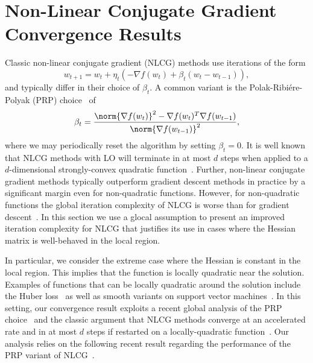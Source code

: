 \documentclass[10pt]{article} %
\newif\ifextended
\begin{document}
\ifextended
\section{Non-Linear Conjugate Gradient Convergence Results}\label{app:NLCG}
Classic non-linear conjugate gradient (NLCG) methods use iterations of the form
\begin{equation}
w_{t+1} = w_t + \eta_t(-\nabla f(w_t) + \beta_t(w_t - w_{t-1})),
\label{eq:NLCG}
\end{equation}
and typically differ in their choice of $\beta_t$. A common variant is the Polak-Ribi\'{e}re-Polyak (PRP) choice~\cite{polak1969note,polyak1969conjugate} of
\begin{equation}
\beta_t = \frac{\norm{\nabla f(w_t)}^2 - \nabla f(w_t)^T\nabla f(w_{t-1})}{\norm{\nabla f(w_{t-1})}^2},
\label{eq:PRP}
\end{equation}
where we may periodically reset the algorithm by setting $\beta_t=0$. It is well known that NLCG methods with LO will terminate in at most $d$ steps
when applied to a $d$-dimensional strongly-convex quadratic function~\cite{nocedal1999numerical}. Further, non-linear conjugate gradient methods typically outperform gradient descent methods in practice by a significant margin even for non-quadratic functions. However, for non-quadratic functions the global iteration complexity of NLCG is worse than for gradient descent~\cite{das2024nonlinear}. In this section we use a glocal assumption to present an improved iteration complexity for NLCG that justifies its use in cases where the Hessian matrix is well-behaved in the local region.

In particular, we consider the extreme case where the Hessian is constant in the local region. This implies that the function is locally quadratic near the solution. Examples of functions that can be locally quadratic around the solution include the Huber loss~\cite{hastie2017elements} as well as smooth variants on support vector machines~\cite{lee2001ssvm,rosset2007piecewise}. In this setting, our convergence result exploits a recent global analysis of the PRP choice~\cite{das2024nonlinear} and the classic argument that NLCG methods converge at an accelerated rate and in at most $d$ steps if restarted on a locally-quadratic function~\cite{nocedal1999numerical}. Our analysis relies on the following recent result regarding the performance of the PRP variant of NLCG~\cite{das2024nonlinear}.
\end{document}
